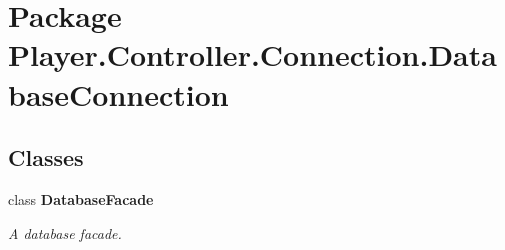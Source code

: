 \section{Package Player.\-Controller.\-Connection.\-Database\-Connection}
\label{namespace_player_1_1_controller_1_1_connection_1_1_database_connection}
\subsection*{Classes}
\begin{DoxyCompactItemize}
\item 
class {\bf Database\-Facade}
\begin{DoxyCompactList}\small\item\em A database facade. \end{DoxyCompactList}\end{DoxyCompactItemize}
